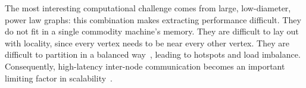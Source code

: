 \documentclass[10pt,nocopyrightspace]{sigplanconf}
\begin{document}






The most interesting computational challenge comes from large,
low-diameter, power law graphs: this combination makes extracting
performance difficult. They do not fit in a single commodity machine's
memory. They are difficult to lay out with locality, since every vertex
needs to be near every other vertex. They are difficult to partition
in a balanced way~\cite{lang, leskovec}, leading to hotspots and load
imbalance. Consequently, high-latency inter-node communication becomes
an important limiting factor in scalability~\cite{yoo:parallelbfs}.


\end{document}
